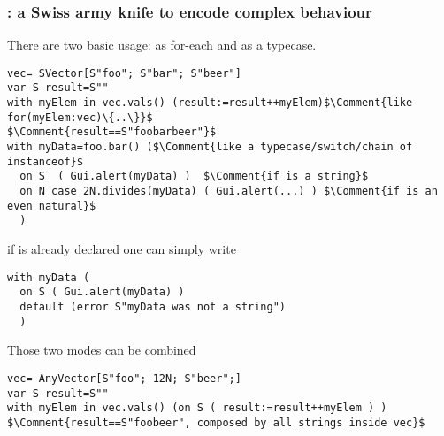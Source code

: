 \begin{frame}[fragile]
\frametitle{\Q@with@: a Swiss army knife to encode complex behaviour}
There are two basic usage: as for-each and as a typecase.
\begin{NiceCode}{59ex}{0.8}
\begin{lstlisting}
vec= SVector[S"foo"; S"bar"; S"beer"]
var S result=S""
with myElem in vec.vals() (result:=result++myElem)$\Comment{like for(myElem:vec)\{..\}}$
$\Comment{result==S"foobarbeer"}$
with myData=foo.bar() ($\Comment{like a typecase/switch/chain of instanceof}$
  on S  ( Gui.alert(myData) )  $\Comment{if is a string}$
  on N case 2N.divides(myData) ( Gui.alert(...) ) $\Comment{if is an even natural}$
  )
\end{lstlisting}
\end{NiceCode}
if \Q@myData@ is already declared one can simply write
\begin{NiceCode}{59ex}{0.8}
\begin{lstlisting}
with myData (
  on S ( Gui.alert(myData) )  
  default (error S"myData was not a string") 
  )
\end{lstlisting}
\end{NiceCode}
Those two modes can be combined
\begin{NiceCode}{59ex}{0.8}
\begin{lstlisting}
vec= AnyVector[S"foo"; 12N; S"beer";]
var S result=S""
with myElem in vec.vals() (on S ( result:=result++myElem ) ) 
$\Comment{result==S"foobeer", composed by all strings inside vec}$
\end{lstlisting}
\end{NiceCode}
\end{frame}


